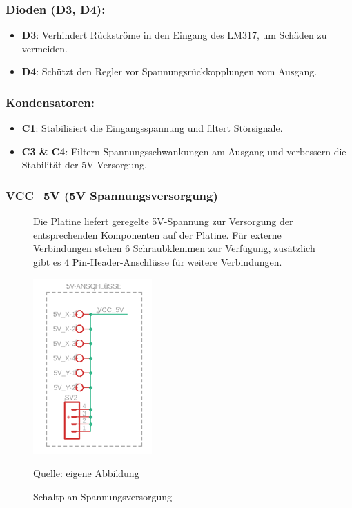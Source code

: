 \documentclass[ngerman,12pt,a4paper]{article}
\begin{document}
		\subsubsection*{Dioden (D3, D4):}
		\begin{itemize}
			\item \textbf{D3}: Verhindert Rückströme in den Eingang des LM317, um Schäden zu vermeiden.
			\item \textbf{D4}: Schützt den Regler vor Spannungsrückkopplungen vom Ausgang.
		\end{itemize}
		
		\subsubsection*{Kondensatoren:}
		\begin{itemize}
			\item \textbf{C1}: Stabilisiert die Eingangsspannung und filtert Störsignale.
			\item \textbf{C3 \& C4}: Filtern Spannungsschwankungen am Ausgang und verbessern die Stabilität der 5V-Versorgung.
		\end{itemize}
		
		\subsubsection*{VCC\_5V (5V Spannungsversorgung)}

		\begin{figure}[htbp]
			\begin{minipage}[t]{6cm}
				\vspace{0pt}
		Die Platine liefert geregelte 5V-Spannung zur Versorgung der entsprechenden Komponenten auf der Platine. Für externe Verbindungen stehen 6 Schraubklemmen zur Verfügung, zusätzlich gibt es 4 Pin-Header-Anschlüsse für weitere Verbindungen.			
			\end{minipage}
		\hfill
			\begin{minipage}[t]{6cm}
				\vspace{0pt}
				\centering
				\includegraphics[scale=0.7]{Pictures/Spannungsversorgung}
				\caption{Schaltplan Spannungsversorgung}
				\label{fig: Spannungsversorgung}
				\vspace{-10pt}
				\begin{center}
					\par\small Quelle: eigene Abbildung
				\end{center}
			\end{minipage}
		\end{figure}
		
\end{document}
